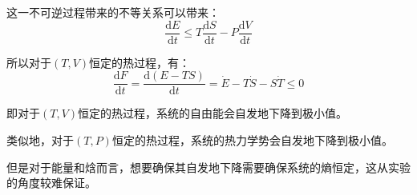 \documentclass[UTF8]{ctexart}
\begin{document}
\begin{spacing}{2.0}
这一不可逆过程带来的不等关系可以带来：
\begin{equation}
\frac{\text{d}E}{\text{d}t}\leq T\frac{\text{d}S}{\text{d}t}-P\frac{\text{d}V}{\text{d}t}
\end{equation}

所以对于$(T,V)$恒定的热过程，有：
\begin{equation}
\frac{\text{d}F}{\text{d}t}=\frac{\text{d}(E-TS)}{\text{d}t}=\dot{E}-T\dot{S}-S\dot{T}\leq 0
\end{equation}

即对于$(T,V)$恒定的热过程，系统的自由能会自发地下降到极小值。

类似地，对于$(T,P)$恒定的热过程，系统的热力学势会自发地下降到极小值。

但是对于能量和焓而言，想要确保其自发地下降需要确保系统的熵恒定，这从实验的角度较难保证。


\end{spacing}
\end{document}
